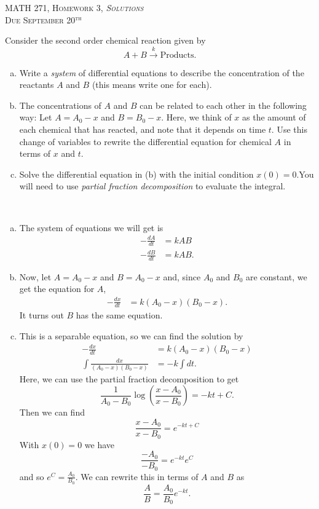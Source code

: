\documentclass[12pt]{article} %
\begin{document}
\begin{center}
   \textsc{\large MATH 271, Homework 3, \emph{Solutions}}\\
   \textsc{Due September 20$^\textrm{th}$}
\end{center}
\vspace{.5cm}

\begin{problem}
Consider the second order chemical reaction given by
\[
A+B \xrightarrow{k} \textrm{Products}.
\]
\begin{enumerate}[(a)]
    \item Write a \emph{system} of differential equations to describe the concentration of the reactants $A$ and $B$ (this means write one for each).
    \item The concentrations of $A$ and $B$ can be related to each other in the following way: Let $A=A_0-x$ and $B=B_0-x$. Here, we think of $x$ as the amount of each chemical that has reacted, and note that it depends on time $t$. Use this change of variables to rewrite the differential equation for chemical $A$ in terms of $x$ and $t$.
    \item Solve the differential equation in (b) with the initial condition $x(0)=0$.You will need to use \emph{partial fraction decomposition} to evaluate the integral.
\end{enumerate}
\end{problem}
\begin{solution}~
\begin{enumerate}[(a)]
    \item The system of equations we will get is
    \begin{align*}
        -\frac{dA}{dt}&=kAB\\
        -\frac{dB}{dt}&=kAB.
    \end{align*}
    \item Now, let $A=A_0-x$ and $B=A_0-x$ and, since $A_0$ and $B_0$ are constant, we get the equation for $A$,
    \begin{align*}
        -\frac{dx}{dt}&=k(A_0-x)(B_0-x).
    \end{align*}
    It turns out $B$ has the same equation.
    \item This is a separable equation, so we can find the solution by
    \begin{align*}
        -\frac{dx}{dt}&=k(A_0-x)(B_0-x)\\
        \int \frac{dx}{(A_0-x)(B_0-x)}&=-k\int dt.
    \end{align*}
    Here, we can use the partial fraction decomposition to get
    \[
    \frac{1}{A_0-B_0}\log\left( \frac{x-A_0}{x-B_0}\right)=-kt+C.
    \]
    Then we can find
    \[
    \frac{x-A_0}{x-B_0}=e^{-kt+C}
    \]
    With $x(0)=0$ we have
    \[
    \frac{-A_0}{-B_0}=e^{-kt}e^C
    \]
    and so $e^C=\frac{A_0}{B_0}$. We can rewrite this in terms of $A$ and $B$ as
    \[
    \frac{A}{B}=\frac{A_0}{B_0}e^{-kt}.
    \]
\end{enumerate}
\end{solution}
\end{document}
